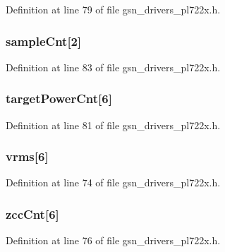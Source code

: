 Definition at line 79 of file gsn\_\-drivers\_\-pl722x.h.

\hypertarget{a00453_a6c250bb82126608cbb957b1bbfe9fde2}{
\subsubsection[{sampleCnt}]{ {\bf sampleCnt}\mbox{[}2\mbox{]}}}
\label{a00453_a6c250bb82126608cbb957b1bbfe9fde2}


Definition at line 83 of file gsn\_\-drivers\_\-pl722x.h.

\hypertarget{a00453_a9439d1b3ab5b7052aebaac942e868af8}{
\subsubsection[{targetPowerCnt}]{ {\bf targetPowerCnt}\mbox{[}6\mbox{]}}}
\label{a00453_a9439d1b3ab5b7052aebaac942e868af8}


Definition at line 81 of file gsn\_\-drivers\_\-pl722x.h.

\hypertarget{a00453_afcfbca6af68960163f3b889c546aa6bb}{
\subsubsection[{vrms}]{ {\bf vrms}\mbox{[}6\mbox{]}}}
\label{a00453_afcfbca6af68960163f3b889c546aa6bb}


Definition at line 74 of file gsn\_\-drivers\_\-pl722x.h.

\hypertarget{a00453_a36a71f747a2c51fac53369d1eccdae26}{
\subsubsection[{zccCnt}]{ {\bf zccCnt}\mbox{[}6\mbox{]}}}
\label{a00453_a36a71f747a2c51fac53369d1eccdae26}


Definition at line 76 of file gsn\_\-drivers\_\-pl722x.h.


